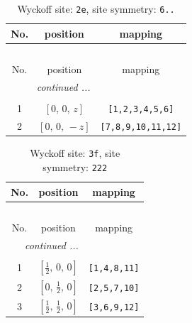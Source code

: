 \documentclass[fleqn,8pt]{jsarticle}
\begin{document}
\begin{longtable}{ccc}
\caption{Wyckoff site: {\tt 2e}, site symmetry: {\tt 6..}}
 \\
 \hline \hline
No. & position & mapping \\ \hline \endfirsthead

\multicolumn{2}{l}{\tablename\ \thetable{}} \\
 \hline \hline
No. & position & mapping \\ \hline \endhead

 \hline \hline
\multicolumn{2}{r}{\footnotesize\it continued ...} \\ \endfoot

 \hline \hline
\multicolumn{2}{r}{} \\ \endlastfoot

1 & $\left[ 0,\, 0,\, z \right]$ & {\tt [1,2,3,4,5,6]} \\ \hline
2 & $\left[ 0,\, 0,\, - z \right]$ & {\tt [7,8,9,10,11,12]} \\
\end{longtable}
\renewcommand{\arraystretch}{1.2}
\begin{longtable}{ccc}
\caption{Wyckoff site: {\tt 3f}, site symmetry: {\tt 222}}
 \\
 \hline \hline
No. & position & mapping \\ \hline \endfirsthead

\multicolumn{2}{l}{\tablename\ \thetable{}} \\
 \hline \hline
No. & position & mapping \\ \hline \endhead

 \hline \hline
\multicolumn{2}{r}{\footnotesize\it continued ...} \\ \endfoot

 \hline \hline
\multicolumn{2}{r}{} \\ \endlastfoot

1 & $\left[ \frac{1}{2},\, 0,\, 0 \right]$ & {\tt [1,4,8,11]} \\ \hline
2 & $\left[ 0,\, \frac{1}{2},\, 0 \right]$ & {\tt [2,5,7,10]} \\ \hline
3 & $\left[ \frac{1}{2},\, \frac{1}{2},\, 0 \right]$ & {\tt [3,6,9,12]} \\
\end{longtable}
\renewcommand{\arraystretch}{1.2}
\end{document}
